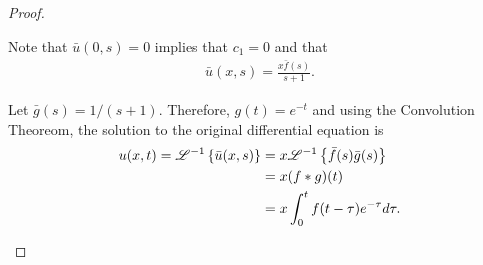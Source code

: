 \begin{proof}
\begin{enumerate}
      Note that $\bar{u}(0, s) = 0$ implies that $c_1 = 0$ and that
      \begin{align*}
        \bar{u}(x, s) = \frac{x\bar{f}(s)}{s+1}.
      \end{align*}

      Let $\bar{g}(s) = 1/(s+1)$. Therefore, $g(t) = e^{-t}$ and using the Convolution Theoreom,
      the solution to the original differential equation is
      \begin{align*}
        u(x,t) = \mathscr{L}^{-1}\left\{ {\bar{u}(x, s)} \right\}
        &= x \mathscr{L}^{-1}\left\{ {\bar{f}(s)\bar{g}(s)} \right\} \\
        &= x (f \ast g)(t) \\
        &= x \int_0^t f(t-\tau) e^{-\tau} d\tau.
      \end{align*}

  \end{enumerate}
\end{proof}
\newpage

